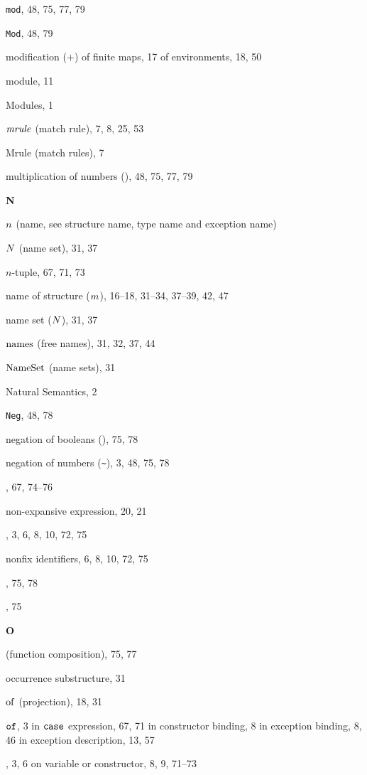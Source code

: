 \begin{theindex}
\item {\tt mod}, 48, 75, 77, 79
\item {\tt Mod}, 48, 79
\item modification ($+$) 
\subitem of finite maps, 17
\subitem of environments, 18, 50
\item module, 11
\item Modules, 1
\item ${\it mrule}$ (match rule), 7, 8, 25, 53
\item Mrule (match rules), 7
\item multiplication of numbers (\ml{*}), 48, 75, 77, 79
\indexspace
\parbox{65mm}{\hfil{\large\bf N}\hfil}
\indexspace
\item $n$ (name, see structure name, type name and exception name) 
\item $N$ (name set), 31, 37
\item $n$-tuple, 67, 71, 73
\item name 
\subitem of structure ($m$), 16--18, 31--34, 37--39, 42, 47
\item name set ($N$), 31, 37
\item $\mathop{\rm names}\nolimits$ (free names), 31, 32, 37, 44
\item ${\rm NameSet}$ (name sets), 31
\item Natural Semantics, 2
\item {\tt Neg}, 48, 78
\item negation of booleans (), 75, 78
\item negation of numbers (\verb+~+), 3, 48, 75, 78
\item \NIL, 67, 74--76
\item non-expansive expression, 20, 21
\item \NONFIX, 3, 6, 8, 10, 72, 75
\item nonfix identifiers, 6, 8, 10, 72, 75
\item {}, 75, 78
\item \NUM, 75
\indexspace
\parbox{65mm}{\hfil{\large\bf O}\hfil}
\indexspace
\item {} (function composition), 75, 77
\item occurrence 
\subitem substructure, 31
\item $\mathbin{\rm of}$ (projection), 18, 31
\item ${\tt of}$, 3
\subitem in ${\tt case}$ expression, 67, 71
\subitem in constructor binding, 8
\subitem in exception binding, 8, 46
\subitem in exception description, 13, 57
\item \OP, 3, 6
\subitem on variable or constructor, 8, 9, 71--73

\end{theindex}

